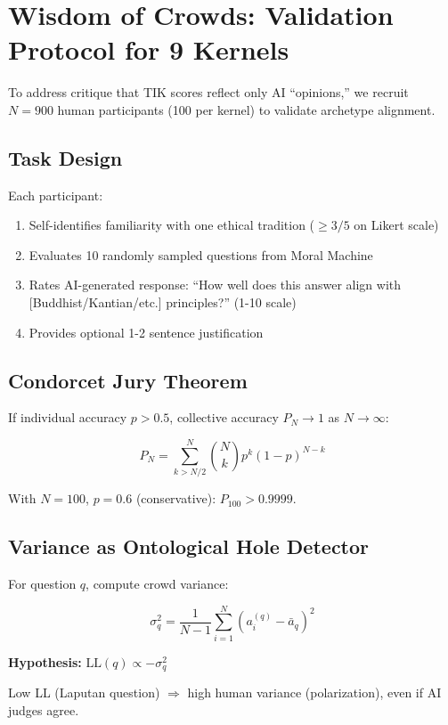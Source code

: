 \documentclass[11pt,a4paper]{article}
\theoremstyle{definition}
\theoremstyle{remark}
\begin{document}

\section{Wisdom of Crowds: Validation Protocol for 9 Kernels}
\label{sec:wisdom-crowds-kernels}

To address critique that TIK scores reflect only AI ``opinions,'' we recruit 
$N=900$ human participants (100 per kernel) to validate archetype alignment.

\subsection{Task Design}

Each participant:
\begin{enumerate}
\item Self-identifies familiarity with one ethical tradition ($\geq 3/5$ on 
Likert scale)
\item Evaluates 10 randomly sampled questions from Moral Machine
\item Rates AI-generated response: ``How well does this answer align with 
[Buddhist/Kantian/etc.] principles?'' (1-10 scale)
\item Provides optional 1-2 sentence justification
\end{enumerate}

\subsection{Condorcet Jury Theorem}

If individual accuracy $p > 0.5$, collective accuracy $P_N \to 1$ as $N \to \infty$:

\[
P_N = \sum_{k > N/2}^N \binom{N}{k} p^k (1-p)^{N-k}
\]

With $N=100$, $p=0.6$ (conservative): $P_{100} > 0.9999$.

\subsection{Variance as Ontological Hole Detector}

For question $q$, compute crowd variance:

\[
\sigma_q^2 = \frac{1}{N-1} \sum_{i=1}^N (a_i^{(q)} - \bar{a}_q)^2
\]

\textbf{Hypothesis:} $\text{LL}(q) \propto -\sigma_q^2$

Low LL (Laputan question) $\Rightarrow$ high human variance (polarization), 
even if AI judges agree.
\end{document}
